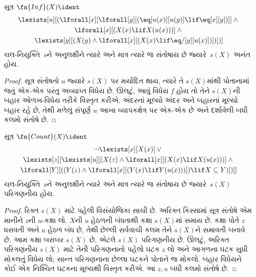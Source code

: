\begin{prop}
સૂત્ર $\fn{Inf}(X) \ident$
\begin{multline*}
\lexists[u][(\lforall[x][\lforall[y][(\eq[u(x)][u(y)] \lif
      \eq[x][y])]] \land {} \\
\lforall[x][(X(x) \lif X(u(x)))] \land {} \\
\lexists[y][(X(y) \land \lforall[x][(X(x)
      \lif \eq/[y][u(x)])])])]
\end{multline*}
ચલ-નિયુક્તિ~$s$ને અનુલક્ષીને ત્યારે અને માત્ર ત્યારે જ સંતોષાય છે
જ્યારે~$s(X)$ અનંત હોય.
\end{prop}
\begin{proof}
સૂત્ર સંતોષતો $u$ જ્યારે $s(X)$ પર મર્યાદિત થાય, ત્યારે તે
$s(X)$માંથી પોતાનામાં જતું એક-એક પરંતુ અવ્યાપ્ત વિધેય છે.
ઊલટું, આવું વિધેય $f$ હોય તો તેને $s(X)$ની બહાર ઓળખ-વિધેય
તરીકે વિસ્તૃત કરીએ. અંદરનાં મૂલ્યો અંદર અને બહારનાં મૂલ્યો બહાર
રહે છે, તેથી મળેલું સંપૂર્ણ $u$ આખા વ્યાપકક્ષેત્ર પર એક-એક છે
અને દર્શાવેલી બધી કલમો સંતોષે છે.
\end{proof}

\begin{prop}
સૂત્ર $\fn{Count}(X) \ident $
\begin{multline*}
\lnot \lexists[x][X(x)] \lor {} \\
\lexists[z][\lexists[u][(X(z) \land
    \lforall[x][(X(x) \lif X(u(x)))] \land {} \\ \lforall[Y][((Y(z) \land
      \lforall[x][(Y(x) \lif Y(u(x)))]) \lif X \subseteq Y)])]]
\end{multline*}
ચલ-નિયુક્તિ~$s$ને અનુલક્ષીને ત્યારે અને માત્ર ત્યારે જ સંતોષાય છે
જ્યારે~$s(X)$ પરિગણનીય હોય.
\end{prop}
\begin{proof}
રિક્ત $s(X)$ માટે પહેલી વિસંયોજિકા સાચી છે. અરિક્ત કિસ્સામાં
સૂત્ર સંતોષે એમ માનીને $z$ની $u$-કક્ષા લો. $X$ની $u$ હેઠળની
બંધતાથી કક્ષા $s(X)$માં સમાય છે. કક્ષા પોતે $z$ ધરાવતી અને
$u$ હેઠળ બંધ છે, તેથી છેલ્લી સર્વવાચી કલમ તેને $s(X)$ને સમાવતી
બનાવે છે. આમ કક્ષા બરાબર $s(X)$ છે, એટલે $s(X)$ પરિગણનીય છે.
ઊલટું, અરિક્ત પરિગણનીય $s(X)$ માટે તેની પરિગણનાનો પહેલો ઘટક
$z$ લો અને આગળના ઘટક સુધી મોકલતું વિધેય લો; સાન્ત પરિગણનાના
છેલ્લા ઘટકને પોતાને જ મોકલો. બહાર વિધેયને કોઈ એક નિશ્ચિત
ઘટકના મૂલ્યથી વિસ્તૃત કરીએ. આ $z,u$ બધી કલમો સંતોષે છે.
\end{proof}

